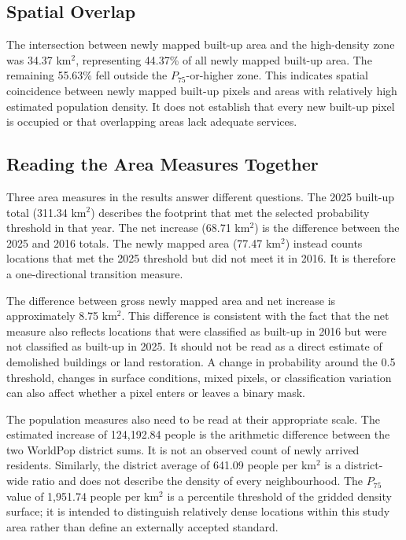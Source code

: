 \documentclass[conference]{IEEEtran}
\begin{document}
\subsection{Spatial Overlap}
The intersection between newly mapped built-up area and the high-density zone was 34.37 km$^2$, representing 44.37\% of all newly mapped built-up area. The remaining 55.63\% fell outside the $P_{75}$-or-higher zone. This indicates spatial coincidence between newly mapped built-up pixels and areas with relatively high estimated population density. It does not establish that every new built-up pixel is occupied or that overlapping areas lack adequate services.

\subsection{Reading the Area Measures Together}
Three area measures in the results answer different questions. The 2025 built-up total (311.34 km$^2$) describes the footprint that met the selected probability threshold in that year. The net increase (68.71 km$^2$) is the difference between the 2025 and 2016 totals. The newly mapped area (77.47 km$^2$) instead counts locations that met the 2025 threshold but did not meet it in 2016. It is therefore a one-directional transition measure.

The difference between gross newly mapped area and net increase is approximately 8.75 km$^2$. This difference is consistent with the fact that the net measure also reflects locations that were classified as built-up in 2016 but were not classified as built-up in 2025. It should not be read as a direct estimate of demolished buildings or land restoration. A change in probability around the 0.5 threshold, changes in surface conditions, mixed pixels, or classification variation can also affect whether a pixel enters or leaves a binary mask.

The population measures also need to be read at their appropriate scale. The estimated increase of 124,192.84 people is the arithmetic difference between the two WorldPop district sums. It is not an observed count of newly arrived residents. Similarly, the district average of 641.09 people per km$^2$ is a district-wide ratio and does not describe the density of every neighbourhood. The $P_{75}$ value of 1,951.74 people per km$^2$ is a percentile threshold of the gridded density surface; it is intended to distinguish relatively dense locations within this study area rather than define an externally accepted standard.
\end{document}
